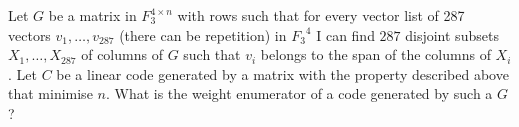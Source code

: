Let $G$ be a matrix in $F_3^{4\times n}$ with rows such that for every vector list of 287 vectors $v_1,\ldots,v_{287}$ (there can be repetition) in ${F_3}^4$ I can find $287$ disjoint subsets $X_1,\dots,X_{287}$ of columns of $G$ such that $v_i$ belongs to the span of the columns of $X_i$. Let $C$ be a linear code generated by a matrix with the property described above that minimise $n$. What is the weight enumerator of a code generated by such a $G$?
